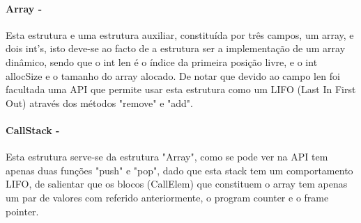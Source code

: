 \documentclass{report}
\begin{document}
\paragraph{\quad Array - }
Esta estrutura e uma estrutura auxiliar, constituída por três campos, um array, e dois int's, isto deve-se ao facto de a estrutura ser a
implementação de um array dinâmico, sendo que o int len é o índice da primeira posição livre, e o int allocSize e o tamanho do array alocado.
De notar que devido ao campo len foi facultada uma API que permite usar esta estrutura como um LIFO (Last In First Out) através dos
métodos "remove" e "add".

\noindent
\par
\begin{Parallel}[v]{0.48\textwidth}{0.48\textwidth}
\ParallelPar
\end{Parallel}

\paragraph{\quad CallStack - } Esta estrutura serve-se da estrutura "Array", como se pode ver na API tem apenas duas funções
 "push" e "pop", dado que esta stack tem um comportamento LIFO, de salientar que os blocos (CallElem) que constituem
 o array tem apenas um par de valores com referido anteriormente, o program counter e o frame pointer.

\noindent
\par
\begin{Parallel}[v]{0.48\textwidth}{0.48\textwidth}
\ParallelPar
\end{Parallel}
\end{document}
